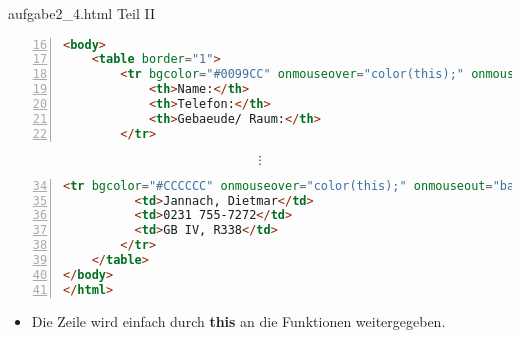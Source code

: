 \begin{frame}[fragile]{aufgabe2\_4.html Teil II}
\tiny{\begin{lstlisting}[language = HTML,
  		   keywordstyle=\color{blue}\bfseries,
  stringstyle=\color{red}\ttfamily,
                   breaklines=true, 
		   firstnumber=16,
                   numbers = left, 
                   numbersep = 3pt]
<body>
	<table border="1">
    	<tr bgcolor="#0099CC" onmouseover="color(this);" onmouseout="backcolor(this)">
        	<th>Name:</th>
        	<th>Telefon:</th>
        	<th>Gebaeude/ Raum:</th>
        </tr>
\end{lstlisting}
\[\vdots\]
\begin{lstlisting}[language = HTML,
  		   keywordstyle=\color{blue}\bfseries,
  stringstyle=\color{red}\ttfamily,
                   breaklines=true, 
		   firstnumber=34,
                   numbers = left, 
                   numbersep = 3pt]
        <tr bgcolor="#CCCCCC" onmouseover="color(this);" onmouseout="backcolor(this)">
          <td>Jannach, Dietmar</td>
          <td>0231 755-7272</td>
          <td>GB IV, R338</td>
        </tr>
    </table>
</body>
</html>
\end{lstlisting}}
\normalsize
\pause
\begin{itemize}
\item Die Zeile wird einfach durch \textbf{this} an die Funktionen weitergegeben.
\end{itemize}
\end{frame}
